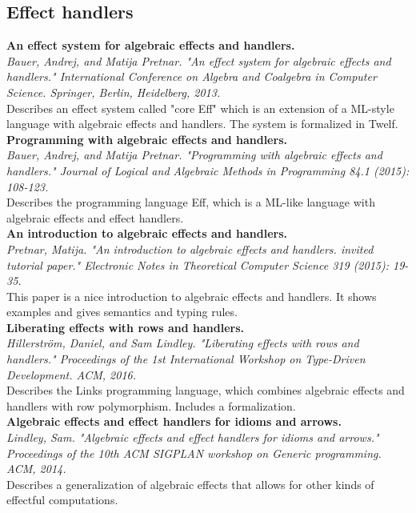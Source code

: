 \documentclass[12pt]{article}
\begin{document}
\subsection{Effect handlers}
\textbf{An effect system for algebraic effects and handlers.} \\
\textit{Bauer, Andrej, and Matija Pretnar. "An effect system for algebraic effects and handlers." International Conference on Algebra and Coalgebra in Computer Science. Springer, Berlin, Heidelberg, 2013.} \\
Describes an effect system called "core Eff" which is an extension of a ML-style language with algebraic effects and handlers. The system is formalized in Twelf.
\\
\textbf{Programming with algebraic effects and handlers.} \\
\textit{Bauer, Andrej, and Matija Pretnar. "Programming with algebraic effects and handlers." Journal of Logical and Algebraic Methods in Programming 84.1 (2015): 108-123.} \\
Describes the programming language Eff, which is a ML-like language with algebraic effects and effect handlers.
\\
\textbf{An introduction to algebraic effects and handlers.} \\
\textit{Pretnar, Matija. "An introduction to algebraic effects and handlers. invited tutorial paper." Electronic Notes in Theoretical Computer Science 319 (2015): 19-35.} \\
This paper is a nice introduction to algebraic effects and handlers. It shows examples and gives semantics and typing rules.
\\
\textbf{Liberating effects with rows and handlers.} \\
\textit{Hillerström, Daniel, and Sam Lindley. "Liberating effects with rows and handlers." Proceedings of the 1st International Workshop on Type-Driven Development. ACM, 2016.} \\
Describes the Links programming language, which combines algebraic effects and handlers with row polymorphism. Includes a formalization.
\\
\textbf{Algebraic effects and effect handlers for idioms and arrows.} \\
\textit{Lindley, Sam. "Algebraic effects and effect handlers for idioms and arrows." Proceedings of the 10th ACM SIGPLAN workshop on Generic programming. ACM, 2014.} \\
Describes a generalization of algebraic effects that allows for other kinds of effectful computations.
\end{document}
